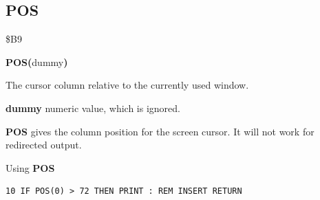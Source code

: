 
\newpage
\subsection{POS}
\begin{description}[leftmargin=2cm,style=nextline]
\item [Token:]    \$B9

\item [Format:]   {\bf POS(}dummy{\bf)}

\item [Returns:]  The cursor column relative to the currently used window.

                  {\bf dummy} numeric value, which is ignored.

\item [Remarks:]  {\bf POS} gives the column position for the screen cursor. It will not work for redirected output.

\item [Example:]  Using {\bf POS}

\begin{tcolorbox}[colback=black,coltext=white]
\verbatimfont{\codefont}
\begin{verbatim}
10 IF POS(0) > 72 THEN PRINT : REM INSERT RETURN
\end{verbatim}
\end{tcolorbox}
\end{description}


\newpage
